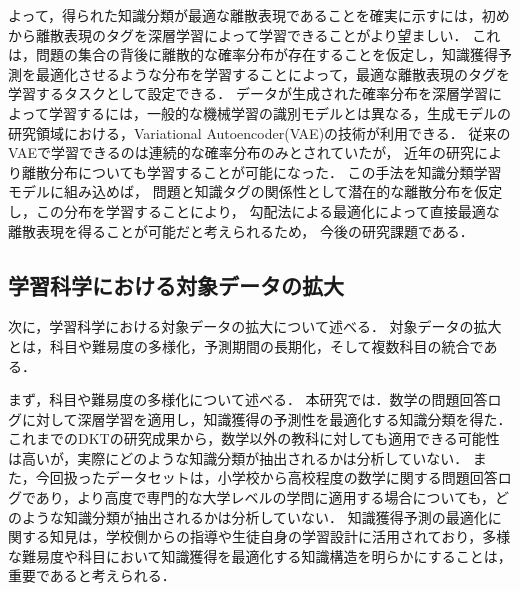 よって，得られた知識分類が最適な離散表現であることを確実に示すには，初めから離散表現のタグを深層学習によって学習できることがより望ましい．
これは，問題の集合の背後に離散的な確率分布が存在することを仮定し，知識獲得予測を最適化させるような分布を学習することによって，最適な離散表現のタグを学習するタスクとして設定できる．
データが生成された確率分布を深層学習によって学習するには，一般的な機械学習の識別モデルとは異なる，生成モデルの研究領域における，Variational Autoencoder(VAE)の技術が利用できる\cite{kingma2014semi}．
従来のVAEで学習できるのは連続的な確率分布のみとされていたが，
近年の研究により離散分布についても学習することが可能になった\cite{maddison2016concrete, jang2016categorical}．
この手法を知識分類学習モデルに組み込めば，
問題と知識タグの関係性として潜在的な離散分布を仮定し，この分布を学習することにより，
勾配法による最適化によって直接最適な離散表現を得ることが可能だと考えられるため，
今後の研究課題である．




\subsection{学習科学における対象データの拡大}
次に，学習科学における対象データの拡大について述べる．
対象データの拡大とは，科目や難易度の多様化，予測期間の長期化，そして複数科目の統合である．


まず，科目や難易度の多様化について述べる．
本研究では．数学の問題回答ログに対して深層学習を適用し，知識獲得の予測性を最適化する知識分類を得た．
これまでのDKTの研究成果から，数学以外の教科に対しても適用できる可能性は高いが，実際にどのような知識分類が抽出されるかは分析していない．
また，今回扱ったデータセットは，小学校から高校程度の数学に関する問題回答ログであり，より高度で専門的な大学レベルの学問に適用する場合についても，どのような知識分類が抽出されるかは分析していない．
知識獲得予測の最適化に関する知見は，学校側からの指導や生徒自身の学習設計に活用されており，多様な難易度や科目において知識獲得を最適化する知識構造を明らかにすることは，重要であると考えられる．


